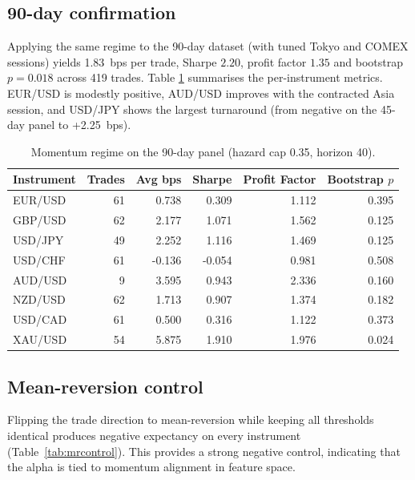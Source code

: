 \documentclass[11pt]{article}
\begin{document}
\subsection{90-day confirmation}
Applying the same regime to the 90-day dataset (with tuned Tokyo and
COMEX sessions) yields \SI{1.83}{bps} per trade, Sharpe \(2.20\), profit
factor \(1.35\) and bootstrap \(p=0.018\) across 419 trades.  Table
\ref{tab:momentum90} summarises the per-instrument metrics.  EUR/USD is
modestly positive, AUD/USD improves with the contracted Asia session,
and USD/JPY shows the largest turnaround (from negative on the 45-day
panel to +\SI{2.25}{bps}).

\begin{table}[h]
  \centering
  \caption{Momentum regime on the 90-day panel (hazard cap 0.35, horizon 40).}
  \label{tab:momentum90}\small
  \begin{tabular}{lrrrrr}
    \toprule
    Instrument & Trades & Avg bps & Sharpe & Profit Factor & Bootstrap $p$ \\
    \midrule
    EUR/USD & 61 & 0.738 & 0.309 & 1.112 & 0.395 \\
    GBP/USD & 62 & 2.177 & 1.071 & 1.562 & 0.125 \\
    USD/JPY & 49 & 2.252 & 1.116 & 1.469 & 0.125 \\
    USD/CHF & 61 & -0.136 & -0.054 & 0.981 & 0.508 \\
    AUD/USD & 9 & 3.595 & 0.943 & 2.336 & 0.160 \\
    NZD/USD & 62 & 1.713 & 0.907 & 1.374 & 0.182 \\
    USD/CAD & 61 & 0.500 & 0.316 & 1.122 & 0.373 \\
    XAU/USD & 54 & 5.875 & 1.910 & 1.976 & 0.024 \\
    \bottomrule
  \end{tabular}
\end{table}

\subsection{Mean-reversion control}
Flipping the trade direction to mean-reversion while keeping all
thresholds identical produces negative expectancy on every instrument
(Table~\ref{tab:mrcontrol}).  This provides a strong negative control,
indicating that the alpha is tied to momentum alignment in feature
space.
\end{document}
